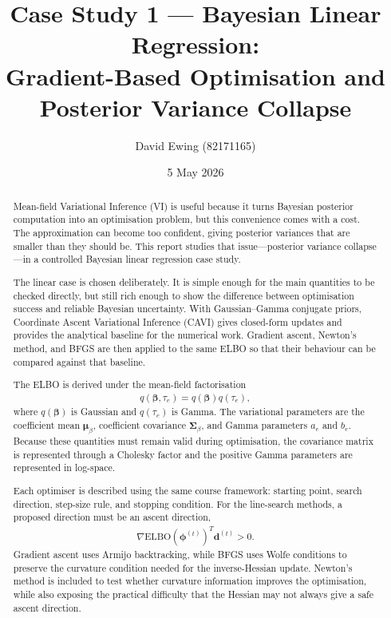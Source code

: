 \documentclass[11pt,a4paper]{article}
\title{
Case Study 1 --- Bayesian Linear Regression:\\[0.4em]
Gradient-Based Optimisation and Posterior Variance Collapse
}
\author{
  David Ewing (82171165)\\
}
\date{5 May 2026}
\newcommand{\ELBO}{\text{ELBO}}
\begin{document}
\maketitle

\begin{abstract}
\setlength{\parindent}{0pt}
\setlength{\parskip}{0.7em}

Mean-field Variational Inference (VI) is useful because it turns Bayesian posterior computation into an optimisation problem, but this convenience comes with a cost. The approximation can become too confident, giving posterior variances that are smaller than they should be. This report studies that issue---posterior variance collapse---in a controlled Bayesian linear regression case study.

The linear case is chosen deliberately. It is simple enough for the main quantities to be checked directly, but still rich enough to show the difference between optimisation success and reliable Bayesian uncertainty. With Gaussian--Gamma conjugate priors, Coordinate Ascent Variational Inference (CAVI) gives closed-form updates and provides the analytical baseline for the numerical work. Gradient ascent, Newton's method, and BFGS are then applied to the same ELBO so that their behaviour can be compared against that baseline.

The ELBO is derived under the mean-field factorisation
\begin{align*}
q(\bm{\beta},\tau_e)=q(\bm{\beta})q(\tau_e),
\end{align*}
where $q(\bm{\beta})$ is Gaussian and $q(\tau_e)$ is Gamma. The variational parameters are the coefficient mean $\bm{\mu}_\beta$, coefficient covariance $\bm{\Sigma}_\beta$, and Gamma parameters $a_e$ and $b_e$. Because these quantities must remain valid during optimisation, the covariance matrix is represented through a Cholesky factor and the positive Gamma parameters are represented in log-space.

Each optimiser is described using the same course framework: starting point, search direction, step-size rule, and stopping condition. For the line-search methods, a proposed direction must be an ascent direction,
\begin{align*}
\nabla\ELBO(\bm{\phi}^{(t)})^T\bm{d}^{(t)} > 0.
\end{align*}
Gradient ascent uses Armijo backtracking, while BFGS uses Wolfe conditions to preserve the curvature condition needed for the inverse-Hessian update. Newton's method is included to test whether curvature information improves the optimisation, while also exposing the practical difficulty that the Hessian may not always give a safe ascent direction.


\end{abstract}
\end{document}
